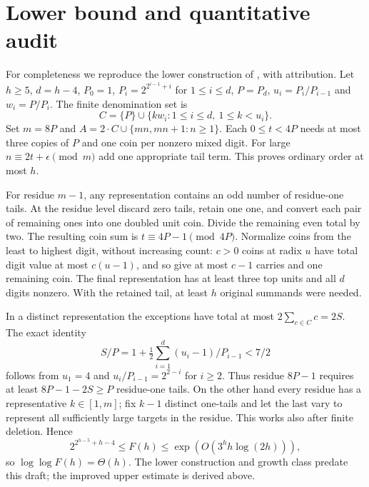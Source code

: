 \documentclass[11pt]{article}
\theoremstyle{remark}\newtheorem{remark}[theorem]{Remark}
\begin{document}
\section{Lower bound and quantitative audit}
For completeness we reproduce the lower construction of \cite{Gao}, with attribution. Let $h\ge5$, $d=h-4$, $P_0=1$, $P_i=2^{2^{i-1}+i}$ for $1\le i\le d$, $P=P_d$, $u_i=P_i/P_{i-1}$ and $w_i=P/P_i$. The finite denomination set is
\[C=\{P\}\cup\{kw_i:1\le i\le d,\ 1\le k<u_i\}.
\]
Set $m=8P$ and $A=2\cdot C\cup\{mn,mn+1:n\ge1\}$. Each $0\le t<4P$ needs at most three copies of $P$ and one coin per nonzero mixed digit. For large $n\equiv2t+\epsilon\pmod m$ add one appropriate tail term. This proves ordinary order at most $h$.

For residue $m-1$, any representation contains an odd number of residue-one tails. At the residue level discard zero tails, retain one one, and convert each pair of remaining ones into one doubled unit coin. Divide the remaining even total by two. The resulting coin sum is $t\equiv4P-1\pmod{4P}$. Normalize coins from the least to highest digit, without increasing count: $c>0$ coins at radix $u$ have total digit value at most $c(u-1)$, and so give at most $c-1$ carries and one remaining coin. The final representation has at least three top units and all $d$ digits nonzero. With the retained tail, at least $h$ original summands were needed.

In a distinct representation the exceptions have total at most $2\sum_{c\in C}c=2S$. The exact identity
\[S/P=1+\tfrac12\sum_{i=1}^d (u_i-1)/P_{i-1}<7/2\]
follows from $u_1=4$ and $u_i/P_{i-1}=2^{2-i}$ for $i\ge2$. Thus residue $8P-1$ requires at least $8P-1-2S\ge P$ residue-one tails. On the other hand every residue has a representative $k\in[1,m]$; fix $k-1$ distinct one-tails and let the last vary to represent all sufficiently large targets in the residue. This works also after finite deletion. Hence
\[2^{2^{h-5}+h-4}\le F(h)\le \exp(O(3^h h\log(2h))),\]
so $\log\log F(h)=\Theta(h)$. The lower construction and growth class predate this draft; the improved upper estimate is derived above.
\end{document}
